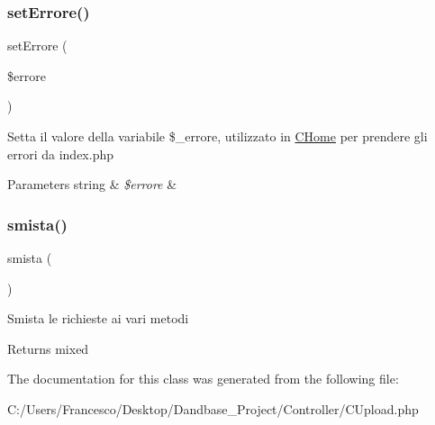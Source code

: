 \subsubsection{\texorpdfstring{set\+Errore()}{setErrore()}}
{\footnotesize\ttfamily set\+Errore (\begin{DoxyParamCaption}\item[{}]{\$errore }\end{DoxyParamCaption})}

Setta il valore della variabile \$\+\_\+errore, utilizzato in \mbox{\hyperlink{class_c_home}{C\+Home}} per prendere gli errori da index.\+php


\begin{DoxyParams}[1]{Parameters}
string & {\em \$errore} & \\
\hline
\end{DoxyParams}
\mbox{\label{class_c_upload_afc7ba180569cef3535974cfc4a1211f1}} 
\subsubsection{\texorpdfstring{smista()}{smista()}}
{\footnotesize\ttfamily smista (\begin{DoxyParamCaption}{ }\end{DoxyParamCaption})}

Smista le richieste ai vari metodi

\begin{DoxyReturn}{Returns}
mixed 
\end{DoxyReturn}


The documentation for this class was generated from the following file\+:\begin{DoxyCompactItemize}
\item 
C\+:/\+Users/\+Francesco/\+Desktop/\+Dandbase\+\_\+\+Project/\+Controller/C\+Upload.\+php\end{DoxyCompactItemize}
